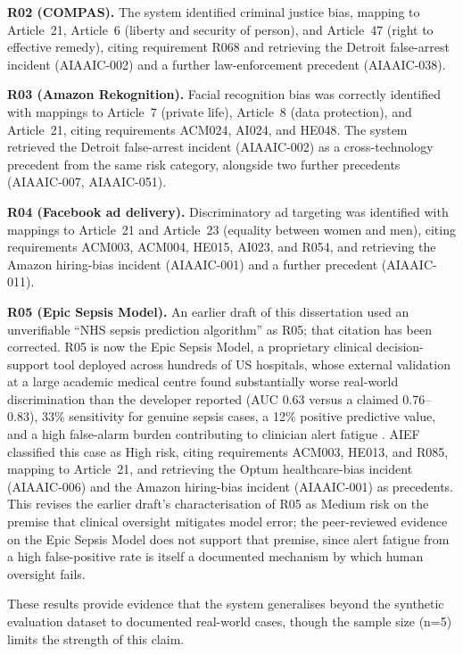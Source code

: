 \textbf{R02 (COMPAS).} The system identified criminal justice bias, mapping to Article~21, Article~6 (liberty and security of person), and Article~47 (right to effective remedy), citing requirement R068 and retrieving the Detroit false-arrest incident (AIAAIC-002) and a further law-enforcement precedent (AIAAIC-038).

\textbf{R03 (Amazon Rekognition).} Facial recognition bias was correctly identified with mappings to Article~7 (private life), Article~8 (data protection), and Article~21, citing requirements ACM024, AI024, and HE048. The system retrieved the Detroit false-arrest incident (AIAAIC-002) as a cross-technology precedent from the same risk category, alongside two further precedents (AIAAIC-007, AIAAIC-051).

\textbf{R04 (Facebook ad delivery).} Discriminatory ad targeting was identified with mappings to Article~21 and Article~23 (equality between women and men), citing requirements ACM003, ACM004, HE015, AI023, and R054, and retrieving the Amazon hiring-bias incident (AIAAIC-001) and a further precedent (AIAAIC-011).

\textbf{R05 (Epic Sepsis Model).} An earlier draft of this dissertation used an unverifiable ``NHS sepsis prediction algorithm'' as R05; that citation has been corrected. R05 is now the Epic Sepsis Model, a proprietary clinical decision-support tool deployed across hundreds of US hospitals, whose external validation at a large academic medical centre found substantially worse real-world discrimination than the developer reported (AUC 0.63 versus a claimed 0.76--0.83), 33\% sensitivity for genuine sepsis cases, a 12\% positive predictive value, and a high false-alarm burden contributing to clinician alert fatigue \cite{wong2021sepsis}. AIEF classified this case as High risk, citing requirements ACM003, HE013, and R085, mapping to Article~21, and retrieving the Optum healthcare-bias incident (AIAAIC-006) and the Amazon hiring-bias incident (AIAAIC-001) as precedents. This revises the earlier draft's characterisation of R05 as Medium risk on the premise that clinical oversight mitigates model error; the peer-reviewed evidence on the Epic Sepsis Model does not support that premise, since alert fatigue from a high false-positive rate is itself a documented mechanism by which human oversight fails.

These results provide evidence that the system generalises beyond the synthetic evaluation dataset to documented real-world cases, though the sample size (n=5) limits the strength of this claim.


